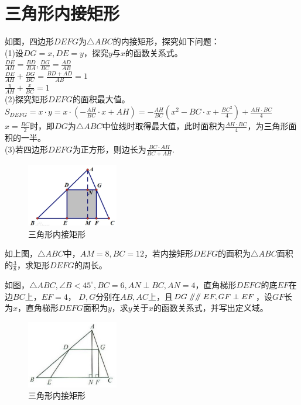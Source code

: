 \documentclass{ecnuthesis}
\newcommand\px{\mathrel{/\mkern-5mu/}}  %
\begin{document}
\section{三角形内接矩形}
\begin{model}
    如图，四边形$DEFG$为$\triangle ABC$的内接矩形，探究如下问题：\\
    (1)设$DG=x,DE=y$，探究$y$与$x$的函数关系式。\\
    $\frac{DE}{AH}=\frac{BD}{BA},\frac{DG}{BC}=\frac{AD}{AB}$ \\
    $\frac{DE}{AH}+\frac{DG}{BC}=\frac{BD+AD}{AB}=1$ \\
    $\frac{y}{AH}+\frac{x}{BC}=1$ \\
    (2)探究矩形$DEFG$的面积最大值。\\
    $S_{DEFG}=x·y=x·(-\frac{AH}{BC}·x+AH)=-\frac{AH}{BC}(x^2-BC·x+\frac{BC^2}{4})+\frac{AH·BC}{4}$ \\
    $x=\frac{BC}{2}$时，即$DG$为$\triangle ABC$中位线时取得最大值，此时面积为$\frac{AH·BC}{4}$，为三角形面积的一半。\\
    (3)若四边形$DEFG$为正方形，则边长为$\frac{BC·AH}{BC+AH}.$ \\
\end{model}
\begin{figure}[H]
\centering
\includegraphics[width=4cm]{picture/825.png}
\caption{三角形内接矩形}
\end{figure}
\begin{problem}
    如上图，$\triangle ABC$中，$AM=8,BC=12$，若内接矩形$DEFG$的面积为$\triangle ABC$面积的$\frac{3}{8}$，求矩形$DEFG$的周长。\\
\end{problem}
\begin{problem}
    如图，$\triangle ABC,\angle B<45^\circ,BC=6,AN\perp BC,AN=4$，直角梯形$DEFG$的底$EF$在边$BC$上，$EF=4$，
    $D,G$分别在$AB,AC$上，且$DG\px \px EF,GF\perp EF$，设$GF$长为$x$，直角梯形$DEFG$面积为$y$，求$y$关于$x$的函数关系式，并写出定义域。\\
\end{problem}
\begin{figure}[H]
\centering
\includegraphics[width=4cm]{picture/829.png}
\caption{三角形内接矩形}
\end{figure}
\clearpage
\end{document}
